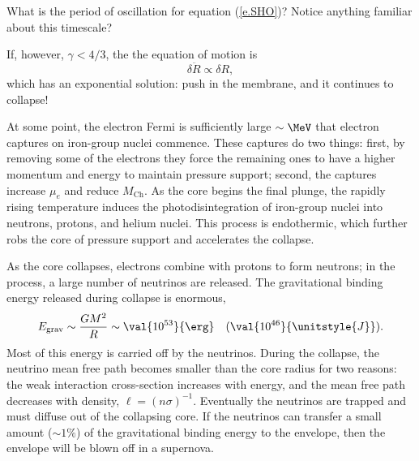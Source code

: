 \begin{sidebar}
\begin{exercisebox}
What is the period of oscillation for equation (\ref{e.SHO})?  Notice anything familiar about this timescale?
\end{exercisebox}

\noindent If, however, $\gamma < 4/3$, the the equation of motion is
\[ \delta\ddot{R} \propto \delta R, \]
which has an exponential solution: push in the membrane, and it continues to collapse!
\end{sidebar}


At some point, the electron Fermi is sufficiently large $\sim\MeV$ that electron captures on iron-group nuclei commence. These captures do two things: first, by removing some of the electrons they force the remaining ones to have a higher momentum and energy to maintain pressure support; second, the captures increase $\mu_{e}$ and reduce $M_{\mathrm{Ch}}$. As the core begins the final plunge, the rapidly rising temperature induces the photodisintegration of iron-group nuclei into neutrons, protons, and helium nuclei. This process is endothermic, which further robs the core of pressure support and accelerates the collapse.

As the core collapses, electrons combine with protons to form neutrons; in the process, a large number of neutrinos are released. The gravitational binding energy released during collapse is enormous,
\[ E_{\mathrm{grav}} \sim \frac{GM^{2}}{R} \sim \val{10^{53}}{\erg}\quad(\val{10^{46}}{\unitstyle{J}}). \]
Most of this energy is carried off by the neutrinos. During the collapse, the neutrino mean free path becomes smaller than the core radius for two reasons: the weak interaction cross-section increases with energy, and the mean free path decreases with density, $\ell = (n\sigma)^{-1}$. Eventually the neutrinos are trapped and must diffuse out of the collapsing core. If the neutrinos can transfer a small amount  ($\sim 1\%$) of the gravitational binding energy to the envelope, then the envelope will be blown off in a supernova.

